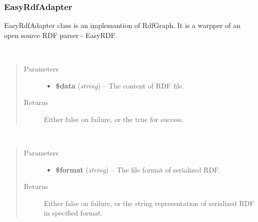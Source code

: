 \documentclass[letterpaper,10pt,english]{sphinxmanual}
\begin{document}
\subsubsection{EasyRdfAdapter}
\label{docs/api:easyrdfadapter}

\begin{fulllineitems}
\label{docs/api:EasyRdfAdapter}
EasyRdfAdapter class is an implemantion of RdfGraph. It is a warpper of an open source RDF parser - EasyRDF.

\begin{fulllineitems}
\label{docs/api:EasyRdfAdapter::parseRdf}~\begin{quote}\begin{description}
\item[{Parameters}] \leavevmode\begin{itemize}
\item {} 
\textbf{\$data} (\emph{string}) -- The content of RDF file.

\end{itemize}

\item[{Returns}] \leavevmode
Either false on failure, or the true for success.

\end{description}\end{quote}

\end{fulllineitems}


\begin{fulllineitems}
\label{docs/api:EasyRdfAdapter::serializeRdfAs}~\begin{quote}\begin{description}
\item[{Parameters}] \leavevmode\begin{itemize}
\item {} 
\textbf{\$format} (\emph{string}) -- The file format of serialized RDF.

\end{itemize}

\item[{Returns}] \leavevmode
Either false on failure, or the string representation of serialized RDF in specified format.

\end{description}\end{quote}

\end{fulllineitems}


\end{fulllineitems}
\end{document}
